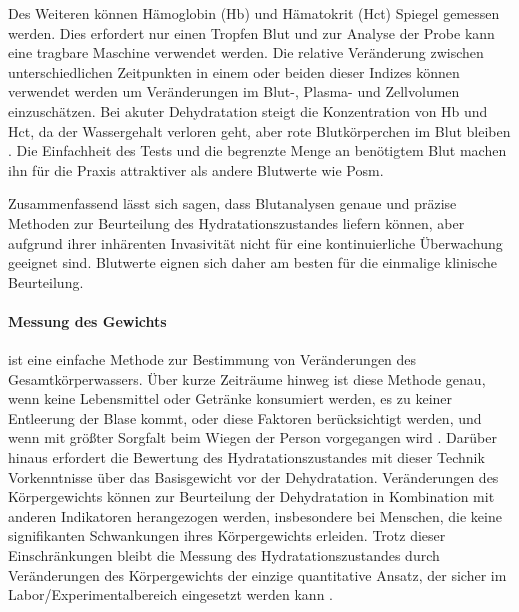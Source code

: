 \documentclass[10pt,a4paper,headinclude,twoside, plainheadsepline, open=right, numbers=noenddot, twocolumn]{article}
\begin{document}
Des Weiteren können Hämoglobin (Hb) und Hämatokrit (Hct) Spiegel gemessen werden.
Dies erfordert nur einen Tropfen Blut und zur Analyse der Probe kann eine tragbare Maschine verwendet werden. 
Die relative Veränderung zwischen unterschiedlichen Zeitpunkten in einem oder beiden dieser Indizes können verwendet werden um Veränderungen im Blut-, Plasma- und Zellvolumen einzuschätzen.
Bei akuter Dehydratation steigt die Konzentration von Hb und Hct, da der Wassergehalt verloren geht, aber rote Blutkörperchen im Blut bleiben \cite{garret2018engineering}.
Die Einfachheit des Tests und die begrenzte Menge an benötigtem Blut machen ihn für die Praxis attraktiver als andere Blutwerte wie Posm.

Zusammenfassend lässt sich sagen, dass Blutanalysen genaue und präzise Methoden zur Beurteilung des Hydratationszustandes liefern können, aber aufgrund ihrer inhärenten Invasivität nicht für eine kontinuierliche Überwachung geeignet sind.
Blutwerte eignen sich daher am besten für die einmalige klinische Beurteilung.

\paragraph{Messung des Gewichts} ist eine einfache Methode zur Bestimmung von Veränderungen des Gesamtkörperwassers.
Über kurze Zeiträume hinweg ist diese Methode genau, wenn keine Lebensmittel oder Getränke konsumiert werden, es zu keiner Entleerung der Blase kommt, oder diese Faktoren berücksichtigt werden, und wenn mit größter Sorgfalt beim Wiegen der Person vorgegangen wird \cite{garret2018engineering}.
Darüber hinaus erfordert die Bewertung des Hydratationszustandes mit dieser Technik Vorkenntnisse über das Basisgewicht vor der Dehydratation.
Veränderungen des Körpergewichts können zur Beurteilung der Dehydratation in Kombination mit anderen Indikatoren herangezogen werden, insbesondere bei Menschen, die keine signifikanten Schwankungen ihres Körpergewichts erleiden. 
Trotz dieser Einschränkungen bleibt die Messung des Hydratationszustandes durch Veränderungen des Körpergewichts der einzige quantitative Ansatz, der sicher im Labor/Experimentalbereich eingesetzt werden kann \cite{kavouras2002assessing}.
\end{document}
